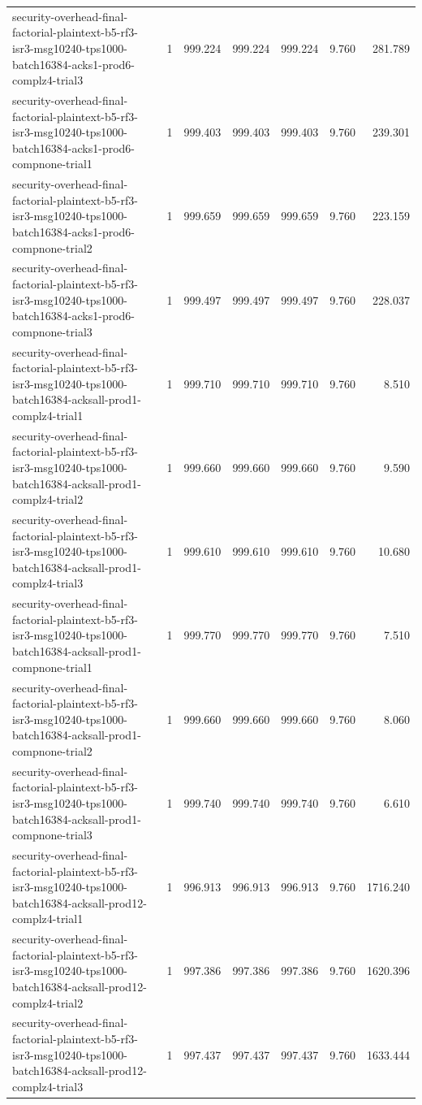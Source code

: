 \begin{tabular}{lrrrrrr}
security-overhead-final-factorial-plaintext-b5-rf3-isr3-msg10240-tps1000-batch16384-acks1-prod6-complz4-trial3 & 1 & 999.224 & 999.224 & 999.224 & 9.760 & 281.789 \\
security-overhead-final-factorial-plaintext-b5-rf3-isr3-msg10240-tps1000-batch16384-acks1-prod6-compnone-trial1 & 1 & 999.403 & 999.403 & 999.403 & 9.760 & 239.301 \\
security-overhead-final-factorial-plaintext-b5-rf3-isr3-msg10240-tps1000-batch16384-acks1-prod6-compnone-trial2 & 1 & 999.659 & 999.659 & 999.659 & 9.760 & 223.159 \\
security-overhead-final-factorial-plaintext-b5-rf3-isr3-msg10240-tps1000-batch16384-acks1-prod6-compnone-trial3 & 1 & 999.497 & 999.497 & 999.497 & 9.760 & 228.037 \\
security-overhead-final-factorial-plaintext-b5-rf3-isr3-msg10240-tps1000-batch16384-acksall-prod1-complz4-trial1 & 1 & 999.710 & 999.710 & 999.710 & 9.760 & 8.510 \\
security-overhead-final-factorial-plaintext-b5-rf3-isr3-msg10240-tps1000-batch16384-acksall-prod1-complz4-trial2 & 1 & 999.660 & 999.660 & 999.660 & 9.760 & 9.590 \\
security-overhead-final-factorial-plaintext-b5-rf3-isr3-msg10240-tps1000-batch16384-acksall-prod1-complz4-trial3 & 1 & 999.610 & 999.610 & 999.610 & 9.760 & 10.680 \\
security-overhead-final-factorial-plaintext-b5-rf3-isr3-msg10240-tps1000-batch16384-acksall-prod1-compnone-trial1 & 1 & 999.770 & 999.770 & 999.770 & 9.760 & 7.510 \\
security-overhead-final-factorial-plaintext-b5-rf3-isr3-msg10240-tps1000-batch16384-acksall-prod1-compnone-trial2 & 1 & 999.660 & 999.660 & 999.660 & 9.760 & 8.060 \\
security-overhead-final-factorial-plaintext-b5-rf3-isr3-msg10240-tps1000-batch16384-acksall-prod1-compnone-trial3 & 1 & 999.740 & 999.740 & 999.740 & 9.760 & 6.610 \\
security-overhead-final-factorial-plaintext-b5-rf3-isr3-msg10240-tps1000-batch16384-acksall-prod12-complz4-trial1 & 1 & 996.913 & 996.913 & 996.913 & 9.760 & 1716.240 \\
security-overhead-final-factorial-plaintext-b5-rf3-isr3-msg10240-tps1000-batch16384-acksall-prod12-complz4-trial2 & 1 & 997.386 & 997.386 & 997.386 & 9.760 & 1620.396 \\
security-overhead-final-factorial-plaintext-b5-rf3-isr3-msg10240-tps1000-batch16384-acksall-prod12-complz4-trial3 & 1 & 997.437 & 997.437 & 997.437 & 9.760 & 1633.444 \\

\end{tabular}
